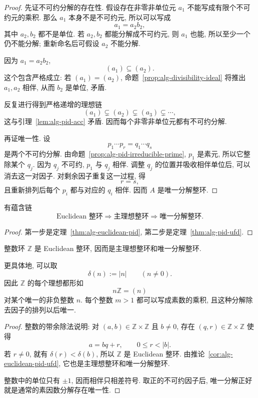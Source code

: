 \documentclass[usesamecnt, thmcnt=section, lang=cn, newtx, 10pt, scheme=chinese]{elegantbook}
\begin{document}
\begin{proof}
先证不可约分解的存在性. 假设存在非零非单位元 $a_1$ 不能写成有限个不可约元的乘积. 那么 $a_1$ 本身不是不可约元, 所以可以写成
\[
 a_1=a_2b_2,
\]
其中 $a_2,b_2$ 都不是单位. 若 $a_2,b_2$ 都能分解成不可约元, 则 $a_1$ 也能, 所以至少一个仍不能分解; 重新命名后可假设 $a_2$ 不能分解.

因为 $a_1=a_2b_2$,
\[
 (a_1)\subseteq(a_2).
\]
这个包含严格成立: 若 $(a_1)=(a_2)$, 命题~\ref{prop:alg-divisibility-ideal} 将推出 $a_1,a_2$ 相伴, 从而 $b_2$ 是单位, 矛盾.

反复进行得到严格递增的理想链
\[
 (a_1)\subsetneq(a_2)\subsetneq(a_3)\subsetneq\cdots,
\]
这与引理~\ref{lem:alg-pid-acc} 矛盾. 因而每个非零非单位元都有不可约分解.

再证唯一性. 设
\[
 p_1\cdots p_r=q_1\cdots q_s
\]
是两个不可约分解. 由命题~\ref{prop:alg-pid-irreducible-prime}, $p_1$ 是素元, 所以它整除某个 $q_j$. 因为 $q_j$ 不可约, $p_1$ 与 $q_j$ 相伴. 调整 $q_j$ 的位置并吸收相伴单位后, 可以消去这一对因子. 对剩余因子重复这一过程, 得
\[
 r=s,
\]
且重新排列后每个 $p_i$ 都与对应的 $q_i$ 相伴. 因而 $A$ 是唯一分解整环.
\end{proof}

\begin{corollary}\label{cor:alg-euclidean-pid-ufd}
有蕴含链
\[
 \boxed{
 \text{Euclidean 整环}
 \Longrightarrow
 \text{主理想整环}
 \Longrightarrow
 \text{唯一分解整环}.
 }
\]
\end{corollary}

\begin{proof}
第一步是定理~\ref{thm:alg-euclidean-pid}, 第二步是定理~\ref{thm:alg-pid-ufd}.
\end{proof}

\begin{corollary}\label{cor:alg-Z-ufd}
整数环 $\mathbb Z$ 是 Euclidean 整环, 因而是主理想整环和唯一分解整环.

更具体地, 可以取
\[
 \delta(n):=|n|
 \qquad(n\neq0).
\]
因此 $\mathbb Z$ 的每个理想都形如
\[
 n\mathbb Z=(n)
\]
对某个唯一的非负整数 $n$. 每个整数 $m>1$ 都可以写成素数的乘积, 且这种分解除去因子的排列以后唯一.
\end{corollary}

\begin{proof}
整数的带余除法说明: 对 $(a,b)\in\mathbb Z\times\mathbb Z$ 且 $b\neq0$, 存在 $(q,r)\in\mathbb Z\times\mathbb Z$ 使得
\[
 a=bq+r,
 \qquad
 0\leq r<|b|.
\]
若 $r\neq0$, 就有 $\delta(r)<\delta(b)$, 所以 $\mathbb Z$ 是 Euclidean 整环. 由推论~\ref{cor:alg-euclidean-pid-ufd}, 它也是主理想整环和唯一分解整环.

整数中的单位只有 $\pm1$, 因而相伴只相差符号. 取正的不可约因子后, 唯一分解正好就是通常的素因数分解存在唯一性.
\end{proof}
\end{document}
